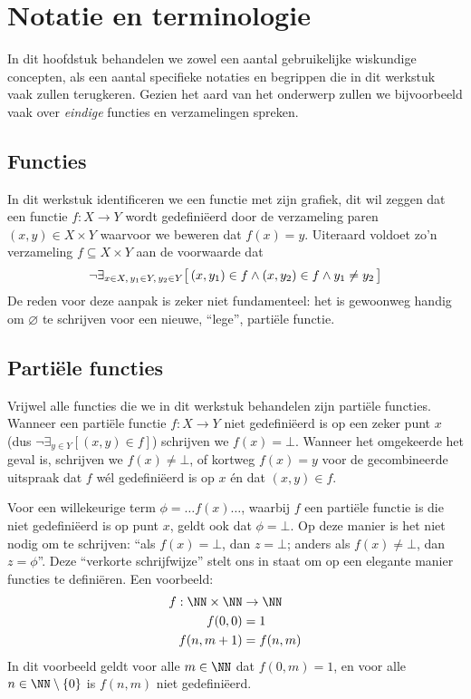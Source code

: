 \chapter{Notatie en terminologie}

In dit hoofdstuk behandelen we zowel een aantal gebruikelijke wiskundige concepten, als een aantal specifieke notaties en begrippen die in dit werkstuk vaak zullen terugkeren. Gezien het aard van het onderwerp zullen we bijvoorbeeld vaak over \emph{eindige} functies en verzamelingen spreken.

\section{Functies}

In dit werkstuk identificeren we een functie met zijn grafiek, dit wil zeggen dat een functie $f : X \to Y$ wordt gedefiniëerd door de verzameling paren $(x, y) \in X \times Y$ waarvoor we beweren dat $f(x) = y$. Uiteraard voldoet zo'n verzameling $f \subseteq X \times Y$ aan de voorwaarde dat
\begin{equation*}
  \neg \exists_{x \in X,\, y_1 \in Y,\, y_2 \in Y} \big[\, (x, y_1) \in f \land (x, y_2) \in f \land y_1 \neq y_2 \,\big]
\end{equation*}
De reden voor deze aanpak is zeker niet fundamenteel: het is gewoonweg handig om $\varnothing$ te schrijven voor een nieuwe, “lege”, partiële functie.

\section{Partiële functies}

Vrijwel alle functies die we in dit werkstuk behandelen zijn partiële functies. Wanneer een partiële functie $f : X \to Y$ niet gedefiniëerd is op een zeker punt $x$ (dus $\neg \exists_{y \in Y} [ (x, y) \in f ]$) schrijven we $f(x) = \bot$. Wanneer het omgekeerde het geval is, schrijven we $f(x) \neq \bot$, of kortweg $f(x) = y$ voor de gecombineerde uitspraak dat $f$ wél gedefiniëerd is op $x$ én dat $(x, y) \in f$.

Voor een willekeurige term $\phi = \dots f(x)\dots$, waarbij $f$ een partiële functie is die niet gedefiniëerd is op punt $x$, geldt ook dat $\phi = \bot$. Op deze manier is het niet nodig om te schrijven: “als $f(x) = \bot$, dan $z = \bot$; anders als $f(x) \neq \bot$, dan $z = \phi$”. Deze “verkorte schrijfwijze” stelt ons in staat om op een elegante manier functies te definiëren. Een voorbeeld:
\begin{align*}
  f : \NN \times \NN &\to \NN \\
  f(0, 0) &= 1 \\
  f(n, m + 1) &= f(n, m)
\end{align*}
In dit voorbeeld geldt voor alle $m \in \NN$ dat $f(0, m) = 1$, en voor alle $n \in \NN \setminus \{0\}$ is $f(n, m)$ niet gedefiniëerd.

